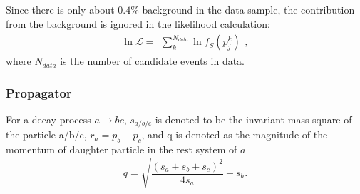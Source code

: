 {    Since there is only about $0.4\%$ background in the data sample, the contribution from the background is ignored in the likelihood calculation:
    \begin{equation}
    \ln{\mathcal{L}} = \begin{matrix}\sum_{k}^{N_{data}} \ln f_{S}(p_{j}^{k})\end{matrix},  \label{likelihood}
    \end{equation}
    where $N_{data}$ is the number of candidate events in data.


    \subsubsection{Propagator}
    \par{
        For a decay process $a \rightarrow bc$, $s_{a/b/c}$ is denoted to be the invariant mass square of the particle a/b/c, $r_{a}=p_{b}-p_{c}$, and q is denoted as the magnitude of the momentum of daughter particle in the rest system of $a$
        \begin{equation}
            q=\sqrt{ \frac{(s_{a} + s_{b} + s_{c})^{2}}{4s_{a}} - s_{b}}. \label{base-q}
        \end{equation}

}}
